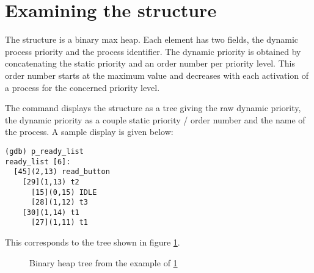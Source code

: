 
\section{Examining the  structure}
\label{sec:readylist}

The structure  is a binary max heap. Each element has two fields, the dynamic process priority and the process identifier. The dynamic priority is obtained by concatenating the static priority and an order number per priority level. This order number starts at the maximum value and decreases with each activation of a process for the concerned priority level.

The  command displays the  structure as a tree giving the raw dynamic priority, the dynamic priority as a couple static priority / order number and the name of the process. A sample display is given below:

\begin{lstlisting}
(gdb) p_ready_list
ready_list [6]:
  [45](2,13) read_button
    [29](1,13) t2
      [15](0,15) IDLE
      [28](1,12) t3
    [30](1,14) t1
      [27](1,11) t1
\end{lstlisting}

This corresponds to the tree shown in figure \ref{fig:bintree}.

\begin{figure}[htbp] %
   \centering
   \caption{Binary heap tree from the example of \ref{sec:readylist}}
   \label{fig:bintree}
\end{figure}
